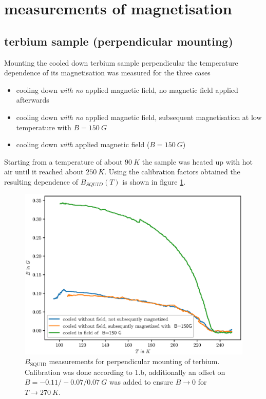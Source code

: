 \documentclass[paper=a4, fontsize=10pt]{scrartcl}
\begin{document}
\section{measurements of magnetisation}

\subsection{terbium sample (perpendicular mounting)}
Mounting the cooled down terbium sample perpendicular the temperature
dependence of its magnetisation was measured for the three cases
\begin{itemize}
\item cooling down \emph{with no} applied magnetic field, no magnetic field
  applied afterwards
\item cooling down \emph{with no} applied magnetic field, subsequent
  magnetisation at low temperature with $B = \SI{150}{G}$
\item cooling down \emph{with} applied magnetic field ($B = \SI{150}{G}$)  
\end{itemize}
Starting from a temperature of about $\SI{90}{K}$ the sample was
heated up with hot air until it reached about $\SI{250}{K}$. Using the
calibration factors obtained the resulting dependence of
$B_{SQUID}(T)$ is shown in figure \ref{fig:terbium_perpendicular}.

\begin{figure}
  \centering
  \includegraphics{plots/2_a_perpendicular}
  \caption{$B_{\mathrm{SQUID}}$ measurements for perpendicular
    mounting of terbium. Calibration was done according to 1.b,
    additionally an offset on $B = -0.11/ -0.07/ \SI{0.07}{G}$ was
    added to ensure $B \rightarrow 0$ for
    $T \rightarrow \SI{270}{K}$.}
  \label{fig:terbium_perpendicular}
\end{figure}
\end{document}
